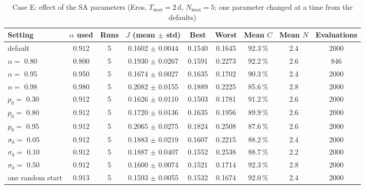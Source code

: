 \begin{table}[htbp]
\centering
\caption{Case E: effect of the \ac{SA} parameters (Eros, $T_{\max}=2$\,d, $N_{\max}=5$; one parameter changed at a time from the defaults)}
\label{tab:sa-params}
\scriptsize
\begin{tabular}{@{}lcccccccc@{}}
\toprule
Setting & $\alpha$ used & Runs & $J$ (mean $\pm$ std) & Best & Worst & Mean $C$ & Mean $N$ & Evaluations \\
\midrule
default & 0.912 & 5 & 0.1602 $\pm$ 0.0044 & 0.1540 & 0.1645 & 92.3\,\% & 2.4 & 2000 \\
$\alpha=$ 0.80 & 0.800 & 5 & 0.1930 $\pm$ 0.0267 & 0.1591 & 0.2273 & 92.2\,\% & 2.6 & 846 \\
$\alpha=$ 0.95 & 0.950 & 5 & 0.1674 $\pm$ 0.0027 & 0.1635 & 0.1702 & 90.3\,\% & 2.4 & 2000 \\
$\alpha=$ 0.98 & 0.980 & 5 & 0.2082 $\pm$ 0.0155 & 0.1889 & 0.2225 & 85.6\,\% & 2.8 & 2000 \\
$p_0=$ 0.30 & 0.912 & 5 & 0.1626 $\pm$ 0.0110 & 0.1503 & 0.1781 & 91.2\,\% & 2.6 & 2000 \\
$p_0=$ 0.80 & 0.912 & 5 & 0.1720 $\pm$ 0.0136 & 0.1635 & 0.1956 & 89.9\,\% & 2.6 & 2000 \\
$p_0=$ 0.95 & 0.912 & 5 & 0.2065 $\pm$ 0.0275 & 0.1824 & 0.2508 & 87.6\,\% & 2.6 & 2000 \\
$\sigma_0=$ 0.05 & 0.912 & 5 & 0.1883 $\pm$ 0.0219 & 0.1607 & 0.2215 & 88.2\,\% & 2.4 & 2000 \\
$\sigma_0=$ 0.10 & 0.912 & 5 & 0.1887 $\pm$ 0.0407 & 0.1552 & 0.2538 & 88.7\,\% & 2.2 & 2000 \\
$\sigma_0=$ 0.50 & 0.912 & 5 & 0.1600 $\pm$ 0.0074 & 0.1521 & 0.1714 & 92.3\,\% & 2.8 & 2000 \\
one random start & 0.913 & 5 & 0.1593 $\pm$ 0.0055 & 0.1532 & 0.1674 & 92.0\,\% & 2.4 & 2000 \\
\bottomrule
\end{tabular}
\end{table}
